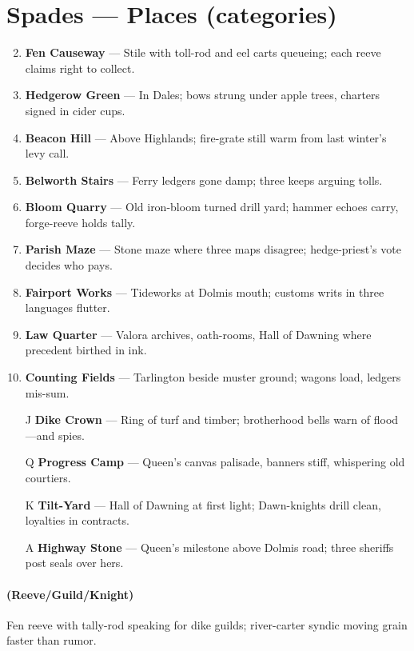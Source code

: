 \section*{Spades --- Places (categories)}
\label{sec:viterra-places}
\begin{enumerate}
\setcounter{enumi}{1}
\item \textbf{Fen Causeway} --- Stile with toll-rod and eel carts queueing; each reeve claims right to collect.
\item \textbf{Hedgerow Green} --- In Dales; bows strung under apple trees, charters signed in cider cups.
\item \textbf{Beacon Hill} --- Above Highlands; fire-grate still warm from last winter's levy call.
\item \textbf{Belworth Stairs} --- Ferry ledgers gone damp; three keeps arguing tolls.
\item \textbf{Bloom Quarry} --- Old iron-bloom turned drill yard; hammer echoes carry, forge-reeve holds tally.
\item \textbf{Parish Maze} --- Stone maze where three maps disagree; hedge-priest's vote decides who pays.
\item \textbf{Fairport Works} --- Tideworks at Dolmis mouth; customs writs in three languages flutter.
\item \textbf{Law Quarter} --- Valora archives, oath-rooms, Hall of Dawning where precedent birthed in ink.
\item \textbf{Counting Fields} --- Tarlington beside muster ground; wagons load, ledgers mis-sum.
\item[J] \textbf{Dike Crown} --- Ring of turf and timber; brotherhood bells warn of flood—and spies.
\item[Q] \textbf{Progress Camp} --- Queen's canvas palisade, banners stiff, whispering old courtiers.
\item[K] \textbf{Tilt-Yard} --- Hall of Dawning at first light; Dawn-knights drill clean, loyalties in contracts.
\item[A] \textbf{Highway Stone} --- Queen's milestone above Dolmis road; three sheriffs post seals over hers.
\end{enumerate}

\paragraph*{(Reeve/Guild/Knight)} Fen reeve with tally-rod speaking for dike guilds; river-carter syndic moving grain faster than rumor.

